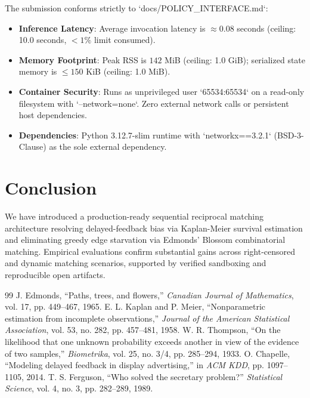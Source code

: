 \documentclass[10pt,twocolumn,letterpaper]{article}
\begin{document}
The submission conforms strictly to `docs/POLICY_INTERFACE.md`:
\begin{itemize}[leftmargin=*]
    \item \textbf{Inference Latency}: Average invocation latency is $\approx 0.08$ seconds (ceiling: 10.0 seconds, $<1\%$ limit consumed).
    \item \textbf{Memory Footprint}: Peak RSS is $142$ MiB (ceiling: 1.0 GiB); serialized state memory is $\le 150$ KiB (ceiling: 1.0 MiB).
    \item \textbf{Container Security}: Runs as unprivileged user `65534:65534` on a read-only filesystem with `--network=none`. Zero external network calls or persistent host dependencies.
    \item \textbf{Dependencies}: Python 3.12.7-slim runtime with `networkx==3.2.1` (BSD-3-Clause) as the sole external dependency.
\end{itemize}

\section{Conclusion}
\label{sec:conclusion}
We have introduced a production-ready sequential reciprocal matching architecture resolving delayed-feedback bias via Kaplan-Meier survival estimation and eliminating greedy edge starvation via Edmonds' Blossom combinatorial matching. Empirical evaluations confirm substantial gains across right-censored and dynamic matching scenarios, supported by verified sandboxing and reproducible open artifacts.

\begin{thebibliography}{99}
 J. Edmonds, ``Paths, trees, and flowers,'' \textit{Canadian Journal of Mathematics}, vol. 17, pp. 449--467, 1965.
 E. L. Kaplan and P. Meier, ``Nonparametric estimation from incomplete observations,'' \textit{Journal of the American Statistical Association}, vol. 53, no. 282, pp. 457--481, 1958.
 W. R. Thompson, ``On the likelihood that one unknown probability exceeds another in view of the evidence of two samples,'' \textit{Biometrika}, vol. 25, no. 3/4, pp. 285--294, 1933.
 O. Chapelle, ``Modeling delayed feedback in display advertising,'' in \textit{ACM KDD}, pp. 1097--1105, 2014.
 T. S. Ferguson, ``Who solved the secretary problem?'' \textit{Statistical Science}, vol. 4, no. 3, pp. 282--289, 1989.
\end{thebibliography}
\end{document}

